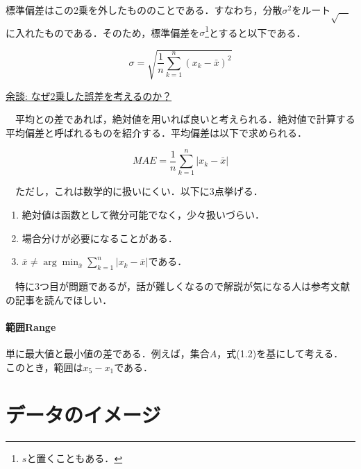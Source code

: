 \documentclass[a4paper,11pt]{ltjsarticle}
\numberwithin{equation}{section}
\renewcommand{\cite}[1]{\textsuperscript{\citep{#1}}}
\begin{document}
標準偏差はこの2乗を外したもののことである．すなわち，分散$\sigma^2$をルート$\sqrt{\quad}$に入れたものである．そのため，標準偏差を$\sigma$\footnote{$s$と置くこともある．}とすると以下である．

\begin{equation}
  \sigma = \sqrt{\frac{1}{n} \sum_{k=1}^n (x_k - \bar{x})^2}
\end{equation}

\begin{boxnote}

  \underline{余談: なぜ2乗した誤差を考えるのか？\cite{var-1}}

  \hspace{5pt}

  　平均との差であれば，絶対値を用いれば良いと考えられる．絶対値で計算する平均偏差と呼ばれるものを紹介する．平均偏差は以下で求められる．

  \begin{equation}
    MAE = \frac{1}{n} \sum_{k=1}^n |x_k - \bar{x}|
  \end{equation}

  　ただし，これは数学的に扱いにくい．以下に3点挙げる．

  \begin{enumerate}
    \item 絶対値は函数として微分可能でなく，少々扱いづらい．
    \item 場合分けが必要になることがある．
    \item $\displaystyle{\bar{x} \ne \arg \min_{\bar{x}} \sum_{k=1}^n |x_k - \bar{x}|}$である．
  \end{enumerate}

  　特に3つ目が問題であるが，話が難しくなるので解説が気になる人は参考文献の記事を読んでほしい．

\end{boxnote}

\subsection{範囲Range}
\label{sec: range}

単に最大値と最小値の差である．例えば，集合$A$，式(1.2)を基にして考える．
このとき，範囲は$x_5 - x_1$である．

\clearpage

\part{データのイメージ}
\label{part: deta}
\end{document}
